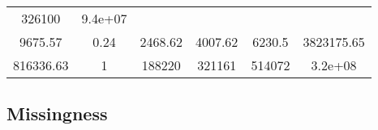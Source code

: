\documentclass[]{book}
\theoremstyle{definition}
\theoremstyle{definition}
\theoremstyle{definition}
\theoremstyle{remark}
\begin{document}
\begin{longtable}[]{@{}cccccc@{}}
\begin{minipage}[t]{0.12\columnwidth}
326100\strut
\end{minipage} & \begin{minipage}[t]{0.14\columnwidth}\centering\strut
9.4e+07\strut
\end{minipage}\tabularnewline
\begin{minipage}[t]{0.14\columnwidth}\centering\strut
9675.57\strut
\end{minipage} & \begin{minipage}[t]{0.08\columnwidth}\centering\strut
0.24\strut
\end{minipage} & \begin{minipage}[t]{0.12\columnwidth}\centering\strut
2468.62\strut
\end{minipage} & \begin{minipage}[t]{0.12\columnwidth}\centering\strut
4007.62\strut
\end{minipage} & \begin{minipage}[t]{0.12\columnwidth}\centering\strut
6230.5\strut
\end{minipage} & \begin{minipage}[t]{0.14\columnwidth}\centering\strut
3823175.65\strut
\end{minipage}\tabularnewline
\begin{minipage}[t]{0.14\columnwidth}\centering\strut
816336.63\strut
\end{minipage} & \begin{minipage}[t]{0.08\columnwidth}\centering\strut
1\strut
\end{minipage} & \begin{minipage}[t]{0.12\columnwidth}\centering\strut
188220\strut
\end{minipage} & \begin{minipage}[t]{0.12\columnwidth}\centering\strut
321161\strut
\end{minipage} & \begin{minipage}[t]{0.12\columnwidth}\centering\strut
514072\strut
\end{minipage} & \begin{minipage}[t]{0.14\columnwidth}\centering\strut
3.2e+08\strut
\end{minipage}\tabularnewline
\bottomrule
\end{longtable}

\subsection{Missingness}\label{missingness}
\end{document}
